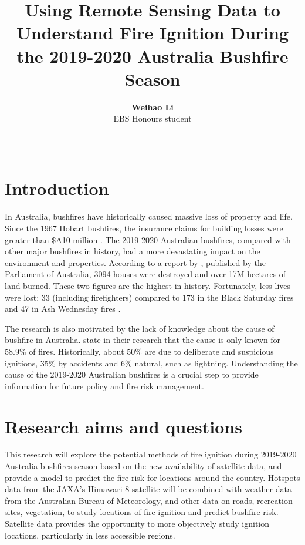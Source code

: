 \documentclass[11pt,a4paper,]{article}
\title{Using Remote Sensing Data to Understand Fire Ignition During the 2019-2020 Australia Bushfire Season}
\author{\sf\Large\textbf{ Weihao Li}\\ {\sf\large EBS Honours student\\[0.5cm]}}
\date{\sf\Date~\Month~\Year}
\makeatletter
\def\titlepage{\front{\expandafter{\@title}}{\@author}{\@organization}}
\makeatother
\begin{document}
\titlepage

\hypertarget{introduction}{%
\section{Introduction}\label{introduction}}

In Australia, bushfires have historically caused massive loss of property and life. Since the 1967 Hobart bushfires, the insurance claims for building losses were greater than \$A10 million \autocite{mcaneney2009100}.
The 2019-2020 Australian bushfires, compared with other major bushfires in history, had a more devastating impact on the environment and properties. According to a report by \textcite{LisaRichardsNigelBrew2020}, published by the Parliament of Australia, 3094 houses were destroyed and over 17M hectares of land burned. These two figures are the highest in history. Fortunately, less lives were lost: 33 (including firefighters) compared to 173 in the Black Saturday fires and 47 in Ash Wednesday fires \autocite{LisaRichardsNigelBrew2020}.

The research is also motivated by the lack of knowledge about the cause of bushfire in Australia. \textcite{beale2011preventing} state in their research that the cause is only known for 58.9\% of fires. Historically, about 50\% are due to deliberate and suspicious ignitions, 35\% by accidents and 6\% natural, such as lightning. Understanding the cause of the 2019-2020 Australian bushfires is a crucial step to provide information for future policy and fire risk management.

\hypertarget{research-aims-and-questions}{%
\section{Research aims and questions}\label{research-aims-and-questions}}

This research will explore the potential methods of fire ignition during 2019-2020 Australia bushfires season based on the new availability of satellite data, and provide a model to predict the fire risk for locations around the country. Hotspots data from the JAXA's Himawari-8 satellite will be combined with weather data from the Australian Bureau of Meteorology, and other data on roads, recreation sites, vegetation, to study locations of fire ignition and predict bushfire risk. Satellite data provides the opportunity to more objectively study ignition locations, particularly in less accessible regions.
\end{document}
